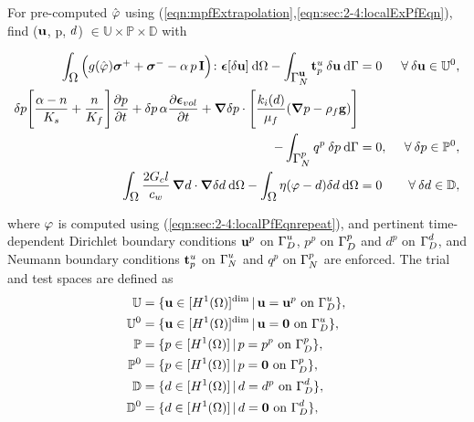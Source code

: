 \documentclass[11pt]{article}
\begin{document}
\begin{vproblem}\label{Problem6}
For pre-computed $\hat{\hbox{$\varphi$}}$ using (\ref{eqn:mpfExtrapolation},\ref{eqn:sec:2-4:localExPfEqn}), find ($\hbox{$\mathbf{u}$}$, p, $\hbox{$d$}$) $\in \mathbb{U} \times \mathbb{P} \times \mathbb{D}$ with

\begin{subequations}
\begin{align}
\int_{\hbox{$\Omega$}}^{} \Big( g(\hat{\hbox{$\varphi$}}) \hbox{$\hbox{\boldmath$\sigma$}^+$} + \hbox{$\hbox{\boldmath$\sigma$}^-$} - \alpha \, p \, \mathbf{I} \Big) \colon\hbox{$\hbox{\boldmath$\epsilon$}$}[\hbox{$\delta\mathbf{u}$}] \: \normalfont \text{d} \hbox{$\Omega$} - \int_{\hbox{$\hbox{$\Gamma$}_{N}^{\scriptsize{\hbox{$\mathbf{u}$}}}$}}^{} \hbox{$\mathbf{t}_{p}^{\scriptsize{\hbox{$u$}}}$} \: \hbox{$\delta\mathbf{u}$} \: \normalfont \text{d}\hbox{$\Gamma$} &= 0  & \: \forall \: \hbox{$\delta\mathbf{u}$} \in \mathbb{U}^0, \label{eqn:P6:EL_momentumbalance} \\
\delta p \Bigg[\dfrac{\alpha - n}{K_s} + \dfrac{n}{K_f} \Bigg] \dfrac{\partial p}{\partial t} + \delta p \, \alpha \dfrac{\partial \hbox{$\hbox{\boldmath$\epsilon$}$}_{vol}}{\partial t} + \hbox{\boldmath$\nabla$} \delta p  \cdot \Bigg[ \dfrac{k_i(d)}{\mu_{f}} ( \hbox{\boldmath$\nabla$} p - \rho_{f} \mathbf{g} ) \Bigg] & & \nonumber \\ 
- \int_{\hbox{$\hbox{$\Gamma$}_{N}^{\scriptsize{p}}$}}^{}  q^{p} \: \delta p \: \normalfont \text{d}\hbox{$\Gamma$} &= 0, & \: \forall \: \delta p \in \mathbb{P}^0, \label{eqn:P6:EL_transport} \\
\int_{\hbox{$\Omega$}}^{} \dfrac{2 \hbox{$G_c$} \hbox{$l$}}{c_w} \, \hbox{\boldmath$\nabla$} \hbox{$d$}\cdot \hbox{\boldmath$\nabla$} \hbox{$\delta\hbox{$d$}$} \normalfont \: \text{d}\hbox{$\Omega$} - \int_{\hbox{$\Omega$}}^{} \eta (\hbox{$\varphi$}-\hbox{$d$}) \hbox{$\delta\hbox{$d$}$} \: \text{d}\hbox{$\Omega$} & = 0 & \: \forall \: \hbox{$\delta\hbox{$d$}$} \in \mathbb{D}, \label{eqn:P6:mpf_evolution}
\end{align}
\end{subequations}

\noindent where $\hbox{$\varphi$}$ is computed using (\ref{eqn:sec:2-4:localPfEqnrepeat}), and pertinent time-dependent Dirichlet boundary conditions $\hbox{$\mathbf{u}$}^p$ on $\hbox{$\hbox{$\Gamma$}_{D}^{\scriptsize{u}}$}$, $p^p$ on $\hbox{$\hbox{$\Gamma$}_{D}^{\scriptsize{p}}$}$ and $d^p$ on $\hbox{$\hbox{$\Gamma$}_{D}^{\scriptsize{d}}$}$, and Neumann boundary conditions $\hbox{$\mathbf{t}_{p}^{\scriptsize{u}}$}$ on $\hbox{$\hbox{$\Gamma$}_{N}^{\scriptsize{u}}$}$ and $q^{p}$ on $\hbox{$\hbox{$\Gamma$}_{N}^{\scriptsize{p}}$}$ are enforced. The trial and test spaces are defined as
\begin{subequations}
\begin{align}
\mathbb{U} & = \{ \hbox{$\mathbf{u}$} \in [H^1(\hbox{$\Omega$})]^{\normalfont\text{dim}} \,|\, \hbox{$\mathbf{u}$} = \hbox{$\mathbf{u}$}^p \text{ on } \hbox{$\hbox{$\Gamma$}_{D}^{\scriptsize{u}}$} \},  {\label{eqn:P6:disp_trialspace}} \\ 
\mathbb{U}^0 & = \{ \hbox{$\mathbf{u}$} \in [H^1(\hbox{$\Omega$})]^{\normalfont\text{dim}} \,|\, \hbox{$\mathbf{u}$} = \mathbf{0} \text{ on } \hbox{$\hbox{$\Gamma$}_{D}^{\scriptsize{u}}$} \},  {\label{eqn:P6:disp_testspace}} \\
\mathbb{P} & = \{ p \in [H^1(\hbox{$\Omega$})] \,|\, p = p^p \text{ on } \hbox{$\hbox{$\Gamma$}_{D}^{\scriptsize{p}}$} \},  {\label{eqn:P6:pres_trialspace}} \\ 
\mathbb{P}^0 & = \{ p \in [H^1(\hbox{$\Omega$})] \,|\, p = \mathbf{0} \text{ on } \hbox{$\hbox{$\Gamma$}_{D}^{\scriptsize{p}}$} \},  {\label{eqn:P6:pres_testspace}} \\
\mathbb{D} & = \{ d \in [H^1(\hbox{$\Omega$})] \,|\, d = d^p \text{ on } \hbox{$\hbox{$\Gamma$}_{D}^{\scriptsize{d}}$} \},  {\label{eqn:P6:micro_trialspace}} \\ 
\mathbb{D}^0 & = \{ d \in [H^1(\hbox{$\Omega$})] \,|\, d = \mathbf{0} \text{ on } \hbox{$\hbox{$\Gamma$}_{D}^{\scriptsize{d}}$} \},  {\label{eqn:P6:micro_testspace}}
\end{align}
\end{subequations} 


\end{vproblem}
\end{document}
